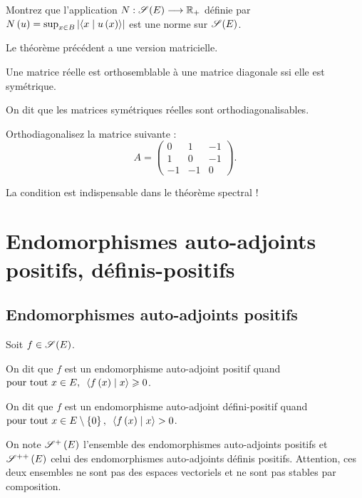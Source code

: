 \begin{exo}
Montrez que l'application \(N:\sym{}[E]\to\Rp\) définie par \(N\paren{u}=\sup_{x\in B}\abs{\ps{x}{u\paren{x}}}\) est une norme sur \(\sym{}[E]\).
\end{exo}

Le théorème précédent a une version matricielle.

\begin{theo}
Une matrice réelle est orthosemblable à une matrice diagonale ssi elle est symétrique.
\end{theo}

On dit que les matrices symétriques réelles sont orthodiagonalisables.

\begin{exo}
Orthodiagonalisez la matrice suivante : \[A=\begin{pmatrix}
0 & 1 & -1 \\
1 & 0 & -1 \\
-1 & -1 & 0
\end{pmatrix}.\]
\end{exo}

\begin{rem}
La condition  est indispensable dans le théorème spectral !
\end{rem}

\section{Endomorphismes auto-adjoints positifs, définis-positifs}

\subsection{Endomorphismes auto-adjoints positifs}

\begin{defi}
Soit \(f\in\sym{}[E]\).

On dit que \(f\) est un endomorphisme auto-adjoint positif quand \(\quantifs{\tpt x\in E}\ps{f\paren{x}}{x}\geq0\).

On dit que \(f\) est un endomorphisme auto-adjoint défini-positif quand \(\quantifs{\tpt x\in E\excluant\accol{0}}\ps{f\paren{x}}{x}>0\).
\end{defi}

On note \(\sympos{}[E]\) l'ensemble des endomorphismes auto-adjoints positifs et \(\symdefpos{}[E]\) celui des endomorphismes auto-adjoints définis positifs. Attention, ces deux ensembles ne sont pas des espaces vectoriels et ne sont pas stables par composition.

